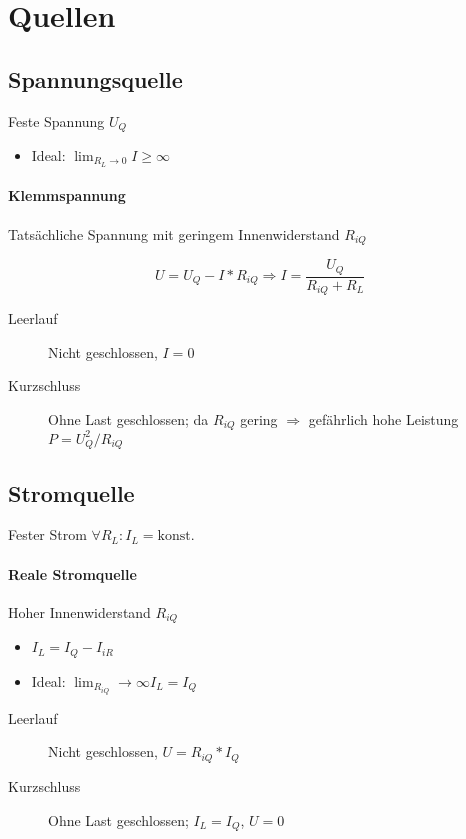 \section{Quellen}

\subsection{Spannungsquelle}

Feste Spannung $U_Q$

\begin{itemize}
  \item Ideal: $\lim_{R_L \rightarrow 0} I \geq \infty$
\end{itemize}

\paragraph{Klemmspannung} Tatsächliche Spannung mit geringem Innenwiderstand $R_{iQ}$

$$U = U_Q - I * R_{iQ} \Rightarrow I = \frac{U_Q}{R_{iQ} + R_L}$$

\begin{description}
  \item[Leerlauf] Nicht geschlossen, $I = 0$
  \item[Kurzschluss] Ohne Last geschlossen; da $R_{iQ}$ gering $\Rightarrow$ gefährlich hohe Leistung $P = U_Q^2 / R_{iQ}$
\end{description}

\subsection{Stromquelle}

Fester Strom $\forall R_L: I_L = \text{konst.}$

\paragraph{Reale Stromquelle} Hoher Innenwiderstand $R_{iQ}$

\begin{itemize}
  \item $I_L = I_Q - I_{iR}$
  \item Ideal: $\lim_{R_{iQ}} \rightarrow \infty I_L = I_Q$
\end{itemize}

\begin{description}
  \item[Leerlauf] Nicht geschlossen, $U = R_{iQ} * I_Q$
  \item[Kurzschluss] Ohne Last geschlossen; $I_L = I_Q$, $U = 0$
\end{description}

